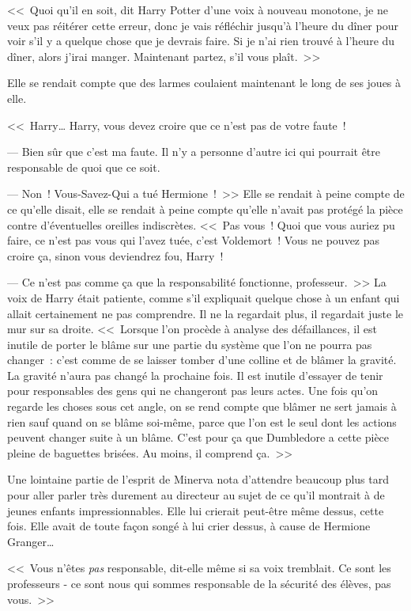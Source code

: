 <<~Quoi qu'il en soit, dit Harry Potter d'une voix à nouveau monotone, je ne veux pas réitérer cette erreur, donc je vais réfléchir jusqu'à l'heure du dîner pour voir s'il y a quelque chose que je devrais faire. Si je n'ai rien trouvé à l'heure du dîner, alors j'irai manger. Maintenant partez, s'il vous plaît.~>>

Elle se rendait compte que des larmes coulaient maintenant le long de ses joues à elle.

<<~Harry… Harry, vous devez croire que ce n'est pas de votre faute~!

--- Bien sûr que c'est ma faute. Il n'y a personne d'autre ici qui pourrait être responsable de quoi que ce soit.

--- Non~! Vous-Savez-Qui a tué Hermione~!~>> Elle se rendait à peine compte de ce qu'elle disait, elle se rendait à peine compte qu'elle n'avait pas protégé la pièce contre d'éventuelles oreilles indiscrètes. <<~Pas vous~! Quoi que vous auriez pu faire, ce n'est pas vous qui l'avez tuée, c'est Voldemort~! Vous ne pouvez pas croire ça, sinon vous deviendrez fou, Harry~!

--- Ce n'est pas comme ça que la responsabilité fonctionne, professeur.~>> La voix de Harry était patiente, comme s'il expliquait quelque chose à un enfant qui allait certainement ne pas comprendre. Il ne la regardait plus, il regardait juste le mur sur sa droite. <<~Lorsque l'on procède à analyse des défaillances, il est inutile de porter le blâme sur une partie du système que l'on ne pourra pas changer~: c'est comme de se laisser tomber d'une colline et de blâmer la gravité. La gravité n'aura pas changé la prochaine fois. Il est inutile d'essayer de tenir pour responsables des gens qui ne changeront pas leurs actes. Une fois qu'on regarde les choses sous cet angle, on se rend compte que blâmer ne sert jamais à rien sauf quand on se blâme soi-même, parce que l'on est le seul dont les actions peuvent changer suite à un blâme. C'est pour ça que Dumbledore a cette pièce pleine de baguettes brisées. Au moins, il comprend ça.~>>

Une lointaine partie de l'esprit de Minerva nota d'attendre beaucoup plus tard pour aller parler très durement au directeur au sujet de ce qu'il montrait à de jeunes enfants impressionnables. Elle lui crierait peut-être même dessus, cette fois. Elle avait de toute façon songé à lui crier dessus, à cause de Hermione Granger…

<<~Vous n'êtes \emph{pas} responsable, dit-elle même si sa voix tremblait. Ce sont les professeurs - ce sont nous qui sommes responsable de la sécurité des élèves, pas vous.~>>

